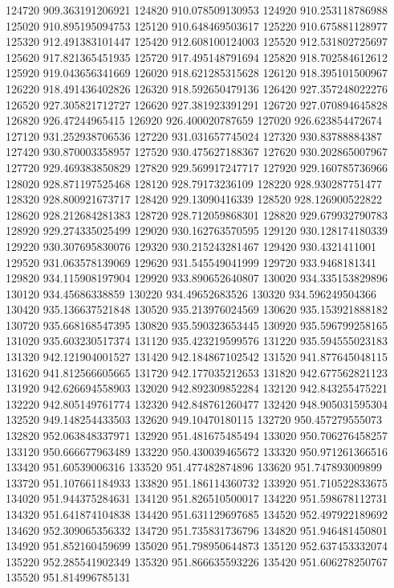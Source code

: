 {124720 909.363191206921
124820 910.078509130953
124920 910.253118786988
125020 910.895195094753
125120 910.648469503617
125220 910.675881128977
125320 912.491383101447
125420 912.608100124003
125520 912.531802725697
125620 917.821365451935
125720 917.495148791694
125820 918.702584612612
125920 919.043656341669
126020 918.621285315628
126120 918.395101500967
126220 918.491436402826
126320 918.592650479136
126420 927.357248022276
126520 927.305821712727
126620 927.381923391291
126720 927.070894645828
126820 926.47244965415
126920 926.400020787659
127020 926.623854472674
127120 931.252938706536
127220 931.031657745024
127320 930.83788884387
127420 930.870003358957
127520 930.475627188367
127620 930.202865007967
127720 929.469383850829
127820 929.569917247717
127920 929.160785736966
128020 928.871197525468
128120 928.79173236109
128220 928.930287751477
128320 928.800921673717
128420 929.13090416339
128520 928.126900522822
128620 928.212684281383
128720 928.712059868301
128820 929.679932790783
128920 929.274335025499
129020 930.162763570595
129120 930.128174180339
129220 930.307695830076
129320 930.215243281467
129420 930.4321411001
129520 931.063578139069
129620 931.545549041999
129720 933.9468181341
129820 934.115908197904
129920 933.890652640807
130020 934.335153829896
130120 934.45686338859
130220 934.49652683526
130320 934.596249504366
130420 935.136637521848
130520 935.213976024569
130620 935.153921888182
130720 935.668168547395
130820 935.590323653445
130920 935.596799258165
131020 935.603230517374
131120 935.423219599576
131220 935.594555023183
131320 942.121904001527
131420 942.184867102542
131520 941.877645048115
131620 941.812566605665
131720 942.177035212653
131820 942.677562821123
131920 942.626694558903
132020 942.892309852284
132120 942.843255475221
132220 942.805149761774
132320 942.848761260477
132420 948.905031595304
132520 949.148254433503
132620 949.10470180115
132720 950.457279555073
132820 952.063848337971
132920 951.481675485494
133020 950.706276458257
133120 950.666677963489
133220 950.430039465672
133320 950.971261366516
133420 951.60539006316
133520 951.477482874896
133620 951.747893009899
133720 951.107661184933
133820 951.186114360732
133920 951.710522833675
134020 951.944375284631
134120 951.826510500017
134220 951.598678112731
134320 951.641874104838
134420 951.631129697685
134520 952.497922189692
134620 952.309065356332
134720 951.735831736796
134820 951.946481450801
134920 951.852160459699
135020 951.798950644873
135120 952.637453332074
135220 952.285541902349
135320 951.866635593226
135420 951.606278250767
135520 951.814996785131
}
